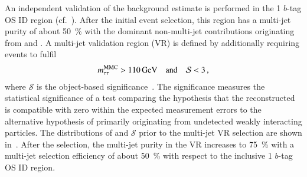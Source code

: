 An independent validation of the background estimate is performed in the 1
$b$-tag OS ID region (cf.\ ). After the initial
event selection, this region has a multi-jet purity of about \SI{50}{\percent}
with the dominant non-multi-jet contributions originating from \Zjets and
\ttbar. A multi-jet validation region (VR) is defined by additionally requiring
events to fulfil
\begin{align*}
  m_{\tau\tau}^\text{MMC} > \SI{110}{\ensuremath{\text{GeV}}} \quad \text{and} \quad \mathcal{S} < 3 \,\text{,}
\end{align*}
where $\mathcal{S}$ is the object-based \pTmissAbs
significance~\cite{ATLAS-CONF-2018-038}. The \pTmissAbs significance measures
the statistical significance of a test comparing the hypothesis that the
reconstructed \pTmissAbs is compatible with zero within the expected measurement
errors to the alternative hypothesis of \pTmissAbs primarily originating from
undetected weakly interacting particles. The distributions of \mMMC and
$\mathcal{S}$ prior to the multi-jet VR selection are shown
in~. After the selection, the multi-jet
purity in the VR increases to \SI{75}{\percent} with a multi-jet selection
efficiency of about \SI{50}{\percent} with respect to the inclusive 1 $b$-tag OS
ID region.


